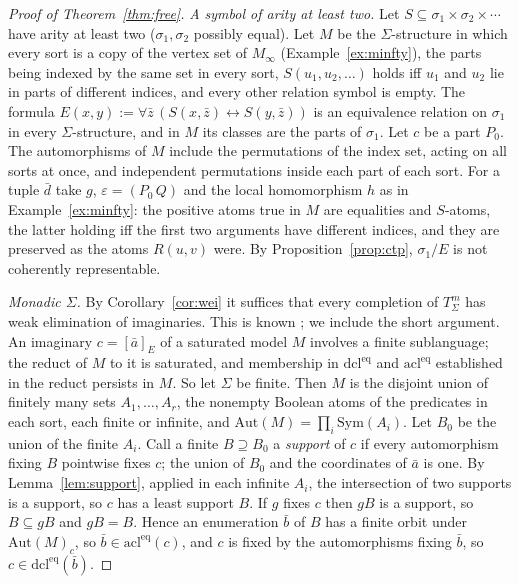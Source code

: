 \documentclass[11pt]{amsart}
\theoremstyle{definition}
\begin{document}
\begin{proof}[Proof of Theorem~\ref{thm:free}]
\emph{A symbol of arity at least two.} Let $S\subseteq\sigma_1\times
\sigma_2\times\cdots$ have arity at least two ($\sigma_1,\sigma_2$
possibly equal). Let $M$ be the $\Sigma$-structure in which every sort
is a copy of the vertex set of $M_\infty$ (Example~\ref{ex:minfty}), the
parts being indexed by the same set in every sort, $S(u_1,u_2,\dots)$
holds iff $u_1$ and $u_2$ lie in parts of different indices, and every
other relation symbol is empty. The formula
$E(x,y):=\forall\bar z\,(S(x,\bar z)\leftrightarrow S(y,\bar z))$ is an
equivalence relation on $\sigma_1$ in every $\Sigma$-structure, and in
$M$ its classes are the parts of $\sigma_1$. Let $c$ be a part $P_0$.
The automorphisms of $M$ include the permutations of the index set,
acting on all sorts at once, and independent permutations inside each
part of each sort. For a tuple $\bar d$ take $g$, $\varepsilon=(P_0\,Q)$
and the local homomorphism $h$ as in Example~\ref{ex:minfty}: the
positive atoms true in $M$ are equalities and $S$-atoms, the latter
holding iff the first two arguments have different indices, and they
are preserved as the atoms $R(u,v)$ were. By
Proposition~\ref{prop:ctp}, $\sigma_1/E$ is not coherently
representable.

\emph{Monadic $\Sigma$.} By Corollary~\ref{cor:wei} it suffices that
every completion of $T_\Sigma^m$ has weak elimination of imaginaries.
This is known \cite[Rem.~7.14]{CDHJR}; we include the short argument.
An imaginary $c=[\bar a]_E$ of a saturated model $M$ involves a finite
sublanguage; the reduct of $M$ to it is saturated, and membership in
$\mathrm{dcl}^{\mathrm{eq}}$ and $\mathrm{acl}^{\mathrm{eq}}$ established
in the reduct persists in $M$. So let $\Sigma$ be finite. Then $M$ is
the disjoint union of finitely many sets $A_1,\dots,A_r$, the nonempty
Boolean atoms of the predicates in each sort, each finite or infinite,
and $\mathrm{Aut}(M)=\prod_i\mathrm{Sym}(A_i)$. Let $B_0$ be the union
of the finite $A_i$. Call a finite $B\supseteq B_0$ a \emph{support} of
$c$ if every automorphism fixing $B$ pointwise fixes $c$; the union of
$B_0$ and the coordinates of $\bar a$ is one. By
Lemma~\ref{lem:support}, applied in each infinite $A_i$, the
intersection of two supports is a support, so $c$ has a least support
$B$. If $g$ fixes $c$ then $gB$ is a support, so $B\subseteq gB$ and
$gB=B$. Hence an enumeration $\bar b$ of $B$ has a finite orbit under
$\mathrm{Aut}(M)_c$, so $\bar b\in\mathrm{acl}^{\mathrm{eq}}(c)$, and $c$
is fixed by the automorphisms fixing $\bar b$, so
$c\in\mathrm{dcl}^{\mathrm{eq}}(\bar b)$.
\end{proof}
\end{document}
